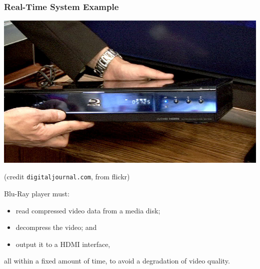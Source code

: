\documentclass[aspectratio=169]{beamer}
\begin{document}
\begin{frame}
\frametitle{Real-Time System Example}

\begin{center}
\includegraphics[width=.6\textwidth]{img/bluray}
\end{center}
\hfill {\small (credit {\tt digitaljournal.com}, from flickr)}

Blu-Ray player must:
\begin{itemize}
\item read compressed video data from a media disk;
\item decompress the video; and
\item output it to a HDMI interface,
\end{itemize}
all within a fixed amount of time, to avoid a degradation of video quality.


\end{frame}
\end{document}

